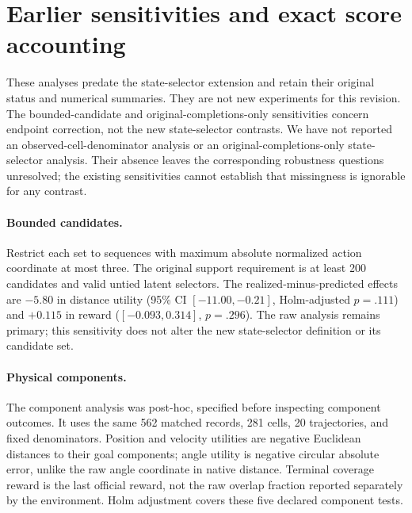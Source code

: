 \documentclass{article}
\begin{document}
\section{Earlier sensitivities and exact score accounting}
\label{app:sensitivity}

These analyses predate the state-selector extension and retain their original
status and numerical summaries. They are not new experiments for this revision.
The bounded-candidate and original-completions-only sensitivities concern
endpoint correction, not the new state-selector contrasts. We have not
reported an observed-cell-denominator analysis or an original-completions-only
state-selector analysis. Their absence leaves the corresponding robustness
questions unresolved; the existing sensitivities cannot establish that
missingness is ignorable for any contrast.

\paragraph{Bounded candidates.}
Restrict each set to sequences with maximum absolute normalized action
coordinate at most three. The original support requirement is at least 200
candidates and valid untied latent selectors. The realized-minus-predicted
effects are $-5.80$ in distance utility (95\% CI $[-11.00,-0.21]$,
Holm-adjusted $p=.111$) and $+0.115$ in reward ($[-0.093,0.314]$, $p=.296$).
The raw analysis remains primary; this sensitivity does not alter the new
state-selector definition or its candidate set.

\paragraph{Physical components.}
The component analysis was post-hoc, specified before inspecting component
outcomes. It uses the same 562 matched records, 281 cells, 20 trajectories,
and fixed denominators. Position and velocity utilities are negative
Euclidean distances to their goal components; angle utility is negative
circular absolute error, unlike the raw angle coordinate in native distance.
Terminal coverage reward is the last official reward, not the raw overlap
fraction reported separately by the environment. Holm adjustment covers these
five declared component tests.
\end{document}
